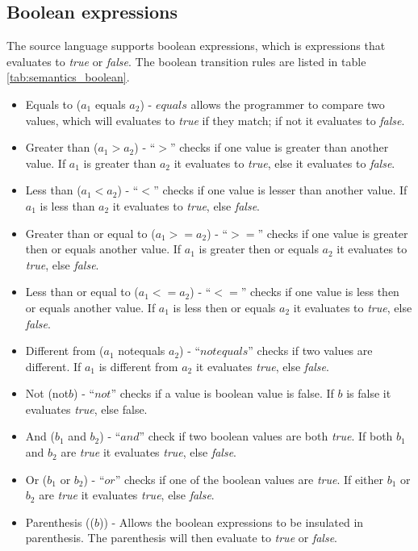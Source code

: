 \subsection{Boolean expressions}
The source language supports boolean expressions, which is expressions that evaluates to \textit{true} or \textit{false}. The boolean transition rules are listed in table \ref{tab:semantics_boolean}.
\begin{itemize}
	\item Equals to ($a_1$ equals $a_2$) - $equals$ allows the programmer to compare two values, which will evaluates to \textit{true} if they match; if not it evaluates to \textit{false}.
	\item Greater than ($a_1 > a_2$) - ``$>$'' checks if one value is greater than another value. If $a_1$ is greater than $a_2$ it evaluates to \textit{true}, else it evaluates to \textit{false}.
	\item Less than ($a_1 < a_2$) - ``$<$'' checks if one value is lesser than another value. If $a_1$ is less than $a_2$ it evaluates to \textit{true}, else \textit{false}.
	\item Greater than or equal to ($a_1 >= a_2$) - ``$>=$'' checks if one value is greater then or equals another value. If $a_1$ is greater then or equals $a_2$ it evaluates to \textit{true}, else \textit{false}.
	\item Less than or equal to ($a_1 <= a_2$) - ``$<=$'' checks if one value is less then or equals another value. If $a_1$ is less then or equals $a_2$ it evaluates to \textit{true}, else \textit{false}.
	\item Different from ($a_1$ notequals $a_2$) - ``$notequals$'' checks if two values are different. If $a_1$ is different from $a_2$ it evaluates \textit{true}, else \textit{false}. 
	\item Not (not$b$) - ``$not$'' checks if a value is boolean value is false. If $b$ is false it evaluates \textit{true}, else false.
	\item And ($b_1$ and $b_2$) - ``$and$'' check if two boolean values are both \textit{true}. If both $b_1$ and $b_2$ are \textit{true} it evaluates \textit{true}, else \textit{false}. 
	\item Or ($b_1$ or $b_2$) - ``$or$'' checks if one of the boolean values are \textit{true}. If either $b_1$ or $b_2$ are \textit{true} it evaluates \textit{true}, else \textit{false}.
	\item Parenthesis (($b$)) - Allows the boolean expressions to be insulated in parenthesis. The parenthesis will then evaluate to \textit{true} or \textit{false}.
\end{itemize}
